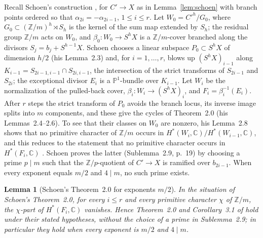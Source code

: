 \documentclass[11pt]{amsart}
\newtheorem{lemma}[theorem]{Lemma}
\theoremstyle{definition}
\theoremstyle{remark}
\newcommand{\Z}{\mathbb Z}
\newcommand{\C}{\mathbb C}
\newcommand{\PP}{\mathbb P}
\begin{document}
Recall Schoen's construction \cite[\S2, pp.~11--19]{Schoen88}, for $C'\to X$ as in Lemma~\ref{lem:schoen} with branch points ordered so that $\alpha_{2i}=-\alpha_{2i-1}$, $1\le i\le r$. Let $W_0=C'^h/G_0$, where $G_0\subset(\Z/m)^h\rtimes S_h$ is the kernel of the sum map extended by $S_h$; the residual group $\Z/m$ acts on $W_0$, and $\beta_0\colon W_0\to S^hX$ is a $\Z/m$-cover branched along the divisors $S_j=b_j+S^{h-1}X$. Schoen chooses a linear subspace $P_0\subset S^hX$ of dimension $h/2$ (his Lemma~2.3) and, for $i=1,\dots,r$, blows up $(S^hX)_{i-1}$ along $K_{i-1}=S_{2i-1,i-1}\cap S_{2i,i-1}$, the intersection of the strict transforms of $S_{2i-1}$ and $S_{2i}$; the exceptional divisor $E_i$ is a $\PP^1$-bundle over $K_{i-1}$. Let $W_i$ be the normalization of the pulled-back cover, $\beta_i\colon W_i\to(S^hX)_i$, and $F_i=\beta_i^{-1}(E_i)$. After $r$ steps the strict transform of $P_0$ avoids the branch locus, its inverse image splits into $m$ components, and these give the cycles of Theorem~2.0 (his Lemmas~2.4--2.6). To see that their classes on $W_0$ are nonzero, his Lemma~2.8 shows that no primitive character of $\Z/m$ occurs in $H^*(W_i,\C)/H^*(W_{i-1},\C)$, and this reduces to the statement that no primitive character occurs in $H^*(F_i,\C)$ \cite[p.~18]{Schoen88}. Schoen proves the latter (Sublemma~2.9, p.~19) by choosing a prime $p\mid m$ such that the $\Z/p$-quotient of $C'\to X$ is ramified over $b_{2i-1}$. When every exponent equals $m/2$ and $4\mid m$, no such prime exists.

\begin{lemma}[Schoen's Theorem~2.0 for exponents $m/2$]\label{lem:schoenR}
In the situation of Schoen's Theorem~2.0, for every $i\le r$ and every primitive character $\chi$ of $\Z/m$, the $\chi$-part of $H^*(F_i,\C)$ vanishes. Hence Theorem~2.0 and Corollary~3.1 of \cite{Schoen88} hold under their stated hypotheses, without the choice of a prime in Sublemma~2.9; in particular they hold when every exponent is $m/2$ and $4\mid m$.
\end{lemma}
\end{document}
